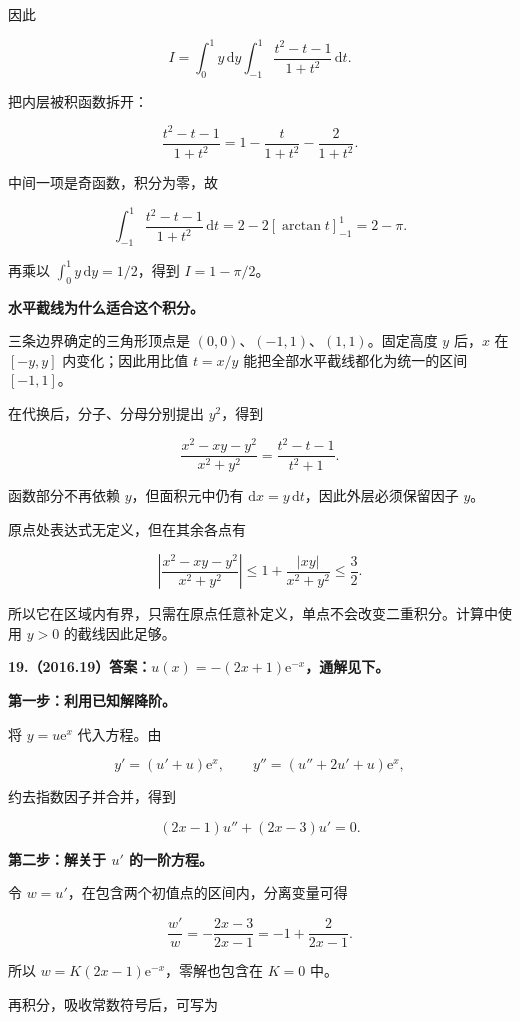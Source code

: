 \documentclass[UTF8,11pt,fontset=windows]{ctexart}
\begin{document}
因此

$$
I=\int_0^1y\,\mathrm dy\int_{-1}^1\frac{t^2-t-1}{1+t^2}\,\mathrm dt.
$$

把内层被积函数拆开：

$$
\frac{t^2-t-1}{1+t^2}=1-\frac{t}{1+t^2}-\frac2{1+t^2}.
$$

中间一项是奇函数，积分为零，故

$$
\int_{-1}^1\frac{t^2-t-1}{1+t^2}\,\mathrm dt
=2-2[\arctan t]_{-1}^1=2-\pi.
$$

再乘以 $\int_0^1y\,\mathrm dy=1/2$，得到 $I=1-\pi/2$。

\textbf{水平截线为什么适合这个积分。}

三条边界确定的三角形顶点是 $(0,0)$、$(-1,1)$、$(1,1)$。固定高度 $y$ 后，$x$ 在 $[-y,y]$ 内变化；因此用比值 $t=x/y$ 能把全部水平截线都化为统一的区间 $[-1,1]$。

在代换后，分子、分母分别提出 $y^2$，得到

$$
\frac{x^2-xy-y^2}{x^2+y^2}
=\frac{t^2-t-1}{t^2+1}.
$$

函数部分不再依赖 $y$，但面积元中仍有 $\mathrm dx=y\,\mathrm dt$，因此外层必须保留因子 $y$。

原点处表达式无定义，但在其余各点有

$$
\left|\frac{x^2-xy-y^2}{x^2+y^2}\right|
\le1+\frac{|xy|}{x^2+y^2}\le\frac32.
$$

所以它在区域内有界，只需在原点任意补定义，单点不会改变二重积分。计算中使用 $y>0$ 的截线因此足够。

\clearpage

\textbf{19.（2016.19）答案：$u(x)=-(2x+1)\mathrm e^{-x}$，通解见下。}

\textbf{第一步：利用已知解降阶。}

将 $y=u\mathrm e^x$ 代入方程。由

$$
y'=(u'+u)\mathrm e^x,
\qquad y''=(u''+2u'+u)\mathrm e^x,
$$

约去指数因子并合并，得到

$$
(2x-1)u''+(2x-3)u'=0.
$$

\textbf{第二步：解关于 $u'$ 的一阶方程。}

令 $w=u'$，在包含两个初值点的区间内，分离变量可得

$$
\frac{w'}w=-\frac{2x-3}{2x-1}=-1+\frac2{2x-1}.
$$

所以 $w=K(2x-1)\mathrm e^{-x}$，零解也包含在 $K=0$ 中。

再积分，吸收常数符号后，可写为
\end{document}
